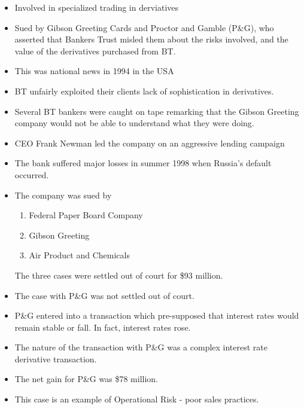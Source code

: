 \documentclass[PRMIA4A.tex]{subfiles}
\begin{document}
\begin{itemize}
\item Involved in specialized trading in derviatives
\item Sued by Gibson Greeting Cards and Proctor and Gamble (P&G), who asserted that Bankers Trust
misled them about the risks involved, and the value of the derivatives purchased from BT.
\item This was national news in 1994 in the USA
\item BT unfairly exploited their clients lack of sophistication in derivatives.
\item Several BT bankers were caught on tape remarking that the Gibson Greeting company would not
be able to understand what they were doing.
\item CEO Frank Newman led the company on an aggressive lending campaign
\item The bank suffered major losses in summer 1998 when Russia's default occurred.
\item The company was sued by
\begin{enumerate}
\item Federal Paper Board Company
\item Gibson Greeting 
\item Air Product and Chemicals
\end{enumerate}
The three cases were settled out of court for \$93 million.
\item The case with P\&G was not settled out of court.
\item P\&G entered into a transaction which pre-supposed that interest rates would remain stable or fall. In fact, interest rates rose.
\item The nature of the transaction with P\&G was a complex interest rate derivative transaction.
\item The net gain for P\&G was \$78 million.
\item This case is an example of Operational Risk - poor sales practices.
\end{itemize}

\end{document}
